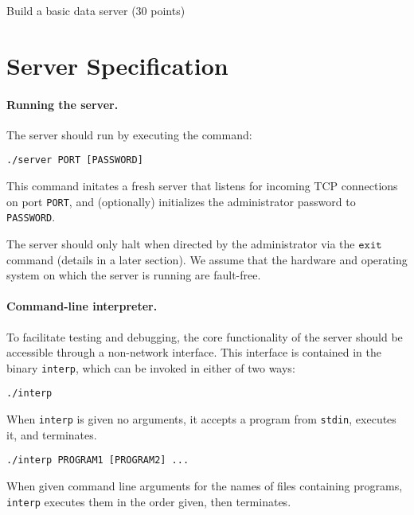 \documentclass[11pt]{article}
\begin{document}
\begin{problem}{Build a basic data server (30 points)}
\section*{Server Specification}

\paragraph{Running the server.} The server should run by executing the command:
\begin{verbatim}
./server PORT [PASSWORD]
\end{verbatim}
This command initates a fresh server that listens for incoming TCP connections on port \texttt{PORT}, and (optionally) initializes the administrator password to \texttt{PASSWORD}.

The server should only halt when directed by the administrator via the $\mathtt{exit}$ command (details in a later section). We assume that the hardware and operating system on which the server is running are fault-free.

\paragraph{Command-line interpreter.} To facilitate testing and debugging, the core functionality of the server should be accessible through a non-network interface. This interface is contained in the binary \texttt{interp}, which can be invoked in either of two ways:
\begin{verbatim}
./interp
\end{verbatim}
When \texttt{interp} is given no arguments, it accepts a program from \texttt{stdin}, executes it, and terminates.
\begin{verbatim}
./interp PROGRAM1 [PROGRAM2] ...
\end{verbatim}
When given command line arguments for the names of files containing programs, \texttt{interp} executes them in the order given, then terminates.


\end{problem}
\end{document}
